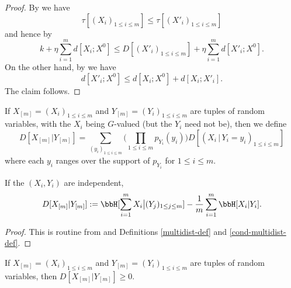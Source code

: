 \begin{proof}\leanok
  By  we have
  $$ \tau[ (X_i)_{1 \leq i \leq m}] \leq \tau[ (X'_i)_{1 \leq i \leq m}]$$
  and hence by 
  $$ k + \eta \sum_{i=1}^m d[X_i; X^0] \leq D[(X'_i)_{1 \leq i \leq m}] + \eta \sum_{i=1}^m d[X'_i; X^0].$$
  On the other hand, by  we have
  $$ d[X'_i; X^0] \leq d[X_i; X^0] + d[X_i; X'_i].$$
  The claim follows.
\end{proof}

\begin{definition}\label{cond-multidist-def}
  \leanok If $X_{[m]} = (X_i)_{1 \leq i \leq m}$ and $Y_{[m]} = (Y_i)_{1 \leq i \leq m}$ are tuples of random variables, with the $X_i$ being $G$-valued (but the $Y_i$ need not be), then we define
  \begin{equation}\label{multi-def-cond-alt}
    D[ X_{[m]} | Y_{[m]} ] = \sum_{(y_i)_{1 \leq i \leq m}} \biggl(\prod_{1 \leq i \leq m} p_{Y_i}(y_i)\biggr) D[ (X_i \,|\, Y_i \mathop{=}y_i)_{1 \leq i \leq m}]
  \end{equation}
  where each $y_i$ ranges over the support of $p_{Y_i}$ for $1 \leq i \leq m$.
\end{definition}

\begin{lemma}\label{cond-multidist-alt}\leanok
If the $(X_i,Y_i)$ are independent,
  \begin{equation}\label{multi-def-cond}
  D[ X_{[m]} | Y_{[m]}] := \bbH[\sum_{i=1}^m X_i \big| (Y_j)_{1 \leq j \leq m} ] - \frac{1}{m} \sum_{i=1}^m \bbH[ X_i | Y_i].
    \end{equation}
\end{lemma}

\begin{proof}\leanok
  This is routine from  and Definitions \ref{multidist-def} and \ref{cond-multidist-def}.
\end{proof}

\begin{lemma}\label{cond-multidist-nonneg}\leanok If $X_{[m]} = (X_i)_{1 \leq i \leq m}$ and $Y_{[m]} = (Y_i)_{1 \leq i \leq m}$ are tuples of random variables, then $D[ X_{[m]} | Y_{[m]} ] \geq 0$.
\end{lemma}

